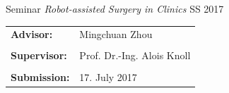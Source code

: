 \begin{figure}[!h]
  \vspace*{5cm}
  {\Large \textsf{Seminar \emph{Robot-assisted Surgery in Clinics} SS 2017}}\\

  \vspace*{1cm}
  \begin{tabular}{ll}
%
%
%
%
    {\Large \bf \textsf{Advisor:}} &
    {\Large \textsf{Mingchuan Zhou}}\\                  %
    \\

    {\Large \bf \textsf{Supervisor:}} &
    {\Large \textsf{Prof. Dr.-Ing. Alois Knoll}}\\
    \\

%
%
%
%
    {\Large \bf \textsf{Submission:}} &
    {\Large \textsf{17. July 2017}}

  \end{tabular}

\end{figure}
